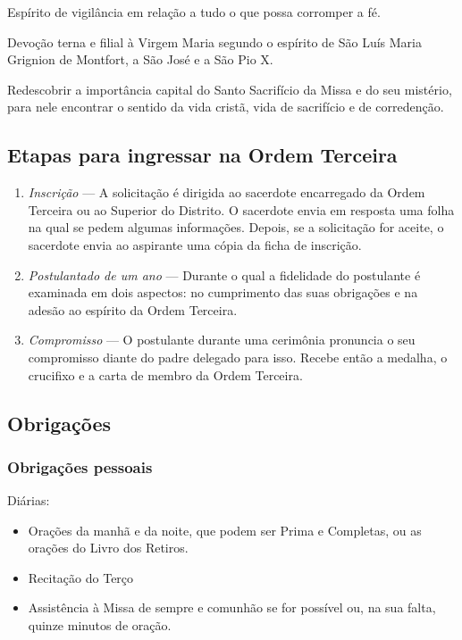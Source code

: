 \documentclass[11pt]{article}
\begin{document}
Espírito de vigilância em relação a tudo o que possa corromper a fé.

Devoção terna e filial à Virgem Maria segundo o espírito de São Luís Maria Grignion de Montfort, a São José e a São Pio X\@.

Redescobrir a importância capital do Santo Sacrifício da Missa e do seu mistério, para nele encontrar o sentido da vida cristã, vida de sacrifício e de corredenção.

\subsection{Etapas para ingressar na Ordem Terceira}\label{subsec:etapas-para-ingressar-na-ordem-terceira}

\begin{enumerate}
  \item \textit{Inscrição} --- A solicitação é dirigida ao sacerdote encarregado da Ordem Terceira ou ao Superior do Distrito.
  O sacerdote envia em resposta uma folha na qual se pedem algumas informações.
  Depois, se a solicitação for aceite, o sacerdote envia ao aspirante uma cópia da ficha de inscrição.
  \item \textit{Postulantado de um ano} --- Durante o qual a fidelidade do postulante é examinada em dois aspectos: no cumprimento das suas obrigações e na adesão ao espírito da Ordem Terceira.
  \item \textit{Compromisso} --- O postulante durante uma cerimônia pronuncia o seu compromisso diante do padre delegado para isso.
  Recebe então a medalha, o crucifixo e a carta de membro da Ordem Terceira.
\end{enumerate}

\subsection{Obrigações}\label{subsec:obrigações}

\subsubsection{Obrigações pessoais}

Diárias:
\begin{itemize}
	\item Orações da manhã e da noite, que podem ser Prima e Completas, ou as orações do Livro dos Retiros.
	\item Recitação do Terço
	\item Assistência à Missa de sempre e comunhão se for possível ou, na sua falta, quinze minutos de oração.
\end{itemize}
\end{document}
